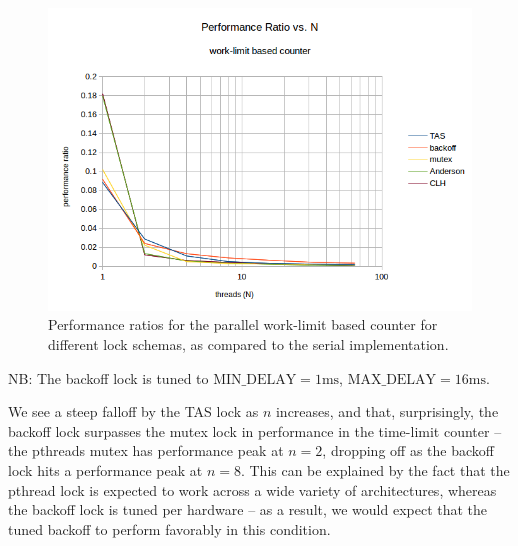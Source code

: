 \documentclass{article}
\newcommand{\cpart}[1]{\newblock{\LARGE {\\\\#1}}}
\newcommand{\code}[1]{\texttt{$\text{#1}$}}
\begin{document}
\begin{figure}
\begin{center}
	\includegraphics[scale=.8]{counter_4.png}
	\caption{Performance ratios for the parallel work-limit based counter for different lock schemas, as compared to the serial implementation.}
	\label{counter_4}
\end{center}
\end{figure}

NB: The backoff lock is tuned to $\code{MIN\_DELAY} = 1\text{ms}$, $\code{MAX\_DELAY} = 16\text{ms}$.

We see a steep falloff by the TAS lock as $n$ increases, and that, surprisingly, the backoff lock surpasses the mutex lock in performance in the time-limit counter 
-- the pthreads mutex has performance peak at $n = 2$, dropping off as the backoff lock hits a performance peak at $n = 8$. This can be explained by the fact that 
the pthread lock is expected to work across a wide variety of architectures, whereas the backoff lock is tuned per hardware -- as a result, we would expect that the 
tuned backoff to perform favorably in this condition.

\cpart{Fairness}
\end{document}
